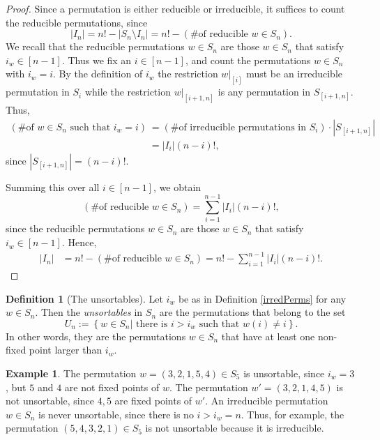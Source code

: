 \documentclass[final,nomarks]{dmtcs-episciences}
\theoremstyle{definition}
\theoremstyle{definition}
\newtheorem{defn}[thm]{Definition}
\newtheorem{exmp}[thm]{Example}
\theoremstyle{remark}
\newcommand{\tup}[1]{\left( #1 \right)}
\newcommand{\set}[1]{\left\{ #1 \right\}}
\newcommand{\card}[1]{\left| #1 \right|}
\begin{document}
\begin{proof}
Since a permutation is either reducible or irreducible, it suffices to count the reducible permutations, since
\[
\card{I_n} = n! - \card{S_n \setminus I_n} = n! - \tup{\text{\# of reducible } w \in S_n}.
\]
We recall that the reducible permutations $w \in S_n$ are those $w \in S_n$ that satisfy $i_w \in [n-1]$.
Thus we fix an $i \in [n-1]$, and count the permutations $w \in S_n$ with $i_w = i$. By the definition of $i_w$ the restriction $w|_{[i]}$ must be an irreducible permutation in $S_i$ while the restriction $w|_{[i+1,n]}$ is any permutation in $S_{[i+1,n]}$.
Thus,
\begin{align*}
    \tup{\text{\# of } w \in S_n \text{ such that } i_w = i} &= \tup{\text{\# of irreducible permutations in } S_i} \cdot \card{S_{[i+1,n]}}\\
    &= \card{I_i}(n-i)!,
\end{align*}
since $\card{S_{[i+1,n]}} = (n-i)!$.

Summing this over all $i \in [n-1]$, we obtain
\[
\tup{\text{\# of reducible } w \in S_n}
= \sum_{i=1}^{n-1} \card{I_i}(n-i)!,
\]
since the reducible permutations $w \in S_n$ are those $w \in S_n$ that satisfy $i_w \in [n-1]$.
Hence,
\begin{align*}
\card{I_n} &= n! - \tup{\text{\# of reducible } w \in S_n}  = n! - \sum_{i=1}^{n-1} \card{I_i}(n-i)!.
\end{align*}
\end{proof}


\begin{defn}[The unsortables]
    \label{def5}
    Let $ i_{w} $ be as in Definition \ref{irredPerms} for any $ w \in S_{n} $. Then the \emph{unsortables} in $ S_{n} $ are the permutations that belong to the set
   \[
   U_{n} := \set{w \in S_{n} | \text{ there is } i > i_{w} \text{ such that } w\tup{ i } \ne i}.
   \]
    In other words, they are the permutations $w \in S_n$ that have at least one non-fixed point larger than $i_w$.
\end{defn}

\begin{exmp}
    The permutation $w = \tup{3,2,1,5,4} \in S_5$ is unsortable, since $i_w=3$, but $5$ and $4$ are not fixed points of $w$. The permutation $w' = \tup{3,2,1,4,5}$ is not unsortable, since $4,5$ are fixed points of $w'$.
    An irreducible permutation $w \in S_n$ is never unsortable, since there is no $i > i_w = n$. Thus, for example, the permutation $\tup{5,4,3,2,1} \in S_5$ is not unsortable because it is irreducible.
\end{exmp}
\end{document}

